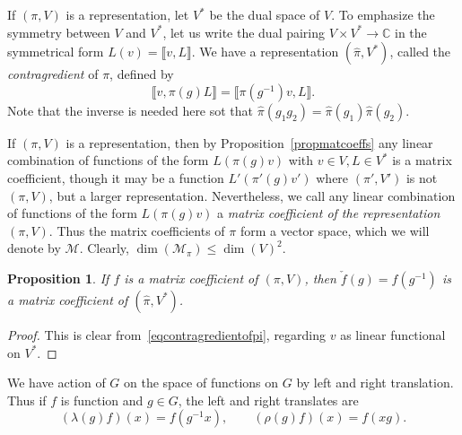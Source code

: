 \documentclass[12pt,reqno]{book}%
\newtheorem{proposition}{Proposition}[chapter]
\theoremstyle{definition}
\theoremstyle{remark}
\theoremstyle{theorem}
\theoremstyle{remark}
\begin{document}
If $(\pi, V)$ is a representation, let $V^*$ be the dual space of $V$.
To emphasize the symmetry between $V$ and $V^*$, let us write the dual pairing $V \times V^* \to \mathbb{C}$ in the symmetrical form $L(v) = \llbracket v, L\rrbracket$.
We have a representation $(\widehat{\pi}, V^*)$, called the \emph{contragredient} of $\pi$, defined by
\begin{equation}\label{eqcontragredientofpi}
    \llbracket v, \pi(g)L \rrbracket = \llbracket \pi(g^{-1})v, L \rrbracket.
\end{equation}
Note that the inverse is needed here sot that $\widehat{\pi}(g_1g_2) = \widehat{\pi}(g_1) \widehat{\pi}(g_2)$.

If $(\pi, V)$ is a representation, then by Proposition~\ref{propmatcoeffs} any linear combination of functions of the form $L(\pi(g)v)$ with $v \in V, L \in V^*$ is a matrix coefficient, though it may be a function $L'(\pi'(g)v')$ where $(\pi', V')$ is not $(\pi, V)$, but a larger representation.
Nevertheless, we call any linear combination of functions of the form $L(\pi(g)v)$ a \emph{matrix coefficient of the representation} $(\pi, V)$.
Thus the matrix coefficients of $\pi$ form a vector space, which we will denote by $\mathscr{M}$.
Clearly, $\dim(\mathscr{M}_\pi) \leq {\dim(V)}^2$.

\begin{proposition}\label{propmatcoeffofpiandpihat}%
    If $f$ is a matrix coefficient of $(\pi, V)$, then $\check{f}(g) = f(g^{-1})$ is a matrix coefficient of $(\widehat{\pi}, V^*)$.
\end{proposition}%
\begin{proof}%
    This is clear from~\eqref{eqcontragredientofpi}, regarding $v$ as linear functional on $V^*$.
\end{proof}%

We have action of $G$ on the space of functions on $G$ by left and right translation.
Thus if $f$ is function and $g \in G$, the left and right translates are
\[
    (\lambda(g)f)(x) = f(g^{-1}x), \qquad (\rho(g)f)(x) = f(xg).
\]
\end{document}
